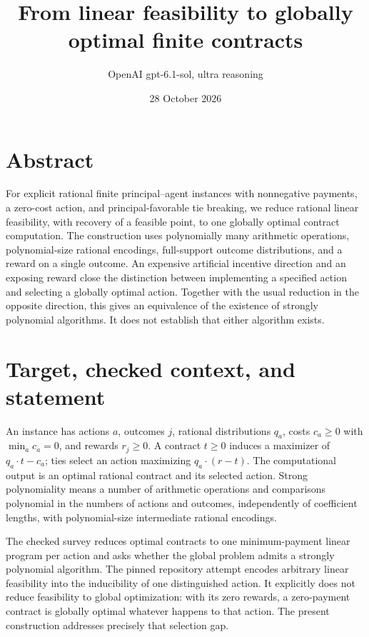 \documentclass[11pt]{article}
\title{From linear feasibility to globally optimal finite contracts}
\author{OpenAI gpt-6.1-sol, ultra reasoning}
\date{28 October 2026}
\begin{document}
\maketitle
\section*{Abstract}
For explicit rational finite principal--agent instances with nonnegative
payments, a zero-cost action, and principal-favorable tie breaking, we reduce
rational linear feasibility, with recovery of a feasible point, to one
globally optimal contract computation. The construction uses polynomially
many arithmetic operations, polynomial-size rational encodings, full-support
outcome distributions, and a reward on a single outcome. An expensive
artificial incentive direction and an exposing reward close the distinction
between implementing a specified action and selecting a globally optimal
action. Together with the usual reduction in the opposite direction, this
gives an equivalence of the existence of strongly polynomial algorithms.
It does not establish that either algorithm exists.


\section{Target, checked context, and statement}
An instance has actions \(a\), outcomes \(j\), rational distributions
\(q_a\), costs \(c_a\geq0\) with \(\min_a c_a=0\), and rewards
\(r_j\geq0\). A contract \(t\geq0\) induces a maximizer of
\(q_a\cdot t-c_a\); ties select an action maximizing
\(q_a\cdot(r-t)\). The computational output is an optimal rational
contract and its selected action. Strong polynomiality means a number of
arithmetic operations and comparisons polynomial in the numbers of actions
and outcomes, independently of coefficient lengths, with polynomial-size
intermediate rational encodings.

The checked survey \cite[Section 3.1]{survey} reduces optimal contracts to
one minimum-payment linear program per action and asks whether the global
problem admits a strongly polynomial algorithm. The pinned repository
attempt \cite[specified-action embedding]{prior} encodes arbitrary linear
feasibility into the inducibility of one distinguished action. It explicitly
does not reduce feasibility to global optimization: with its zero rewards,
a zero-payment contract is globally optimal whatever happens to that action.
The present construction addresses precisely that selection gap.
\end{document}
